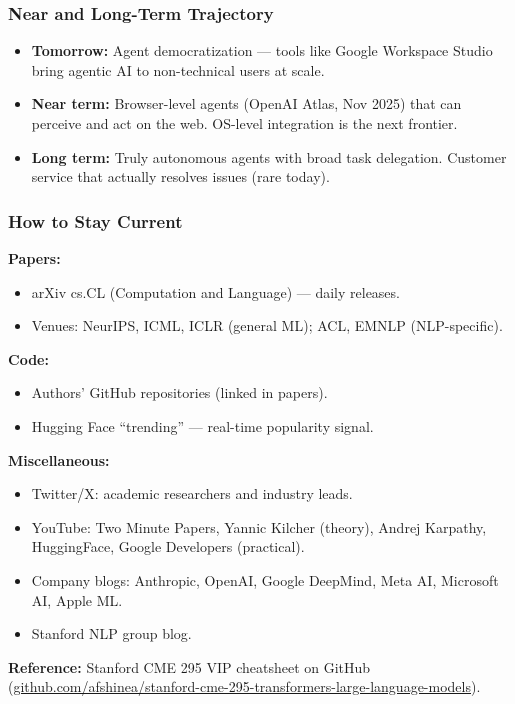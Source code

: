 \documentclass[11pt, a4paper]{article}
\begin{document}
\subsubsection{Near and Long-Term Trajectory}

\begin{itemize}[leftmargin=2em]
  \item \textbf{Tomorrow:} Agent democratization --- tools like Google Workspace Studio bring agentic AI to non-technical users at scale.
  \item \textbf{Near term:} Browser-level agents (OpenAI Atlas, Nov 2025) that can perceive and act on the web. OS-level integration is the next frontier.
  \item \textbf{Long term:} Truly autonomous agents with broad task delegation. Customer service that actually resolves issues (rare today).
\end{itemize}

\subsubsection{How to Stay Current}

\begin{tealbox}
\textbf{Papers:}
\begin{itemize}[leftmargin=1.5em]
  \item arXiv cs.CL (Computation and Language) --- daily releases.
  \item Venues: NeurIPS, ICML, ICLR (general ML); ACL, EMNLP (NLP-specific).
\end{itemize}
\textbf{Code:}
\begin{itemize}[leftmargin=1.5em]
  \item Authors' GitHub repositories (linked in papers).
  \item Hugging Face ``trending'' --- real-time popularity signal.
\end{itemize}
\textbf{Miscellaneous:}
\begin{itemize}[leftmargin=1.5em]
  \item Twitter/X: academic researchers and industry leads.
  \item YouTube: Two Minute Papers, Yannic Kilcher (theory), Andrej Karpathy, HuggingFace, Google Developers (practical).
  \item Company blogs: Anthropic, OpenAI, Google DeepMind, Meta AI, Microsoft AI, Apple ML.
  \item Stanford NLP group blog.
\end{itemize}
\textbf{Reference:} Stanford CME 295 VIP cheatsheet on GitHub (\url{github.com/afshinea/stanford-cme-295-transformers-large-language-models}).
\end{tealbox}
\end{document}
